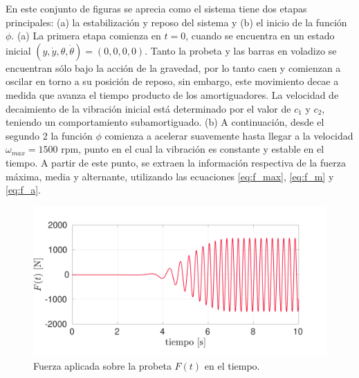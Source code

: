 En este conjunto de figuras se aprecia como el sistema tiene dos etapas principales: (a) la estabilización y reposo del sistema y (b) el inicio de la función $\phi$. (a) La primera etapa comienza en $t=0$, cuando se encuentra en un estado inicial $(y, \dot{y}, \theta, \dot{\theta}) = (0,0,0,0)$. Tanto la probeta y las barras en voladizo se encuentran sólo bajo la acción de la gravedad, por lo tanto caen y comienzan a oscilar en torno a su posición de reposo, sin embargo, este movimiento decae a medida que avanza el tiempo producto de los amortiguadores. La velocidad de decaimiento de la vibración inicial está determinado por el valor de $c_1$ y $c_2$, teniendo un comportamiento subamortiguado. (b) A continuación, desde el segundo 2 la función $\phi$ comienza a acelerar suavemente hasta llegar a la velocidad $\omega_{max} = 1500$ rpm, punto en el cual la vibración es constante y estable en el tiempo. A partir de este punto, se extraen la información respectiva de la fuerza máxima, media y alternante, utilizando las ecuaciones \ref{eq:f_max}, \ref{eq:f_m} y \ref{eq:f_a}. 

\begin{figure}[h]
\centering
\includegraphics[width=0.95\linewidth, trim={0cm 1cm 2cm 1cm},clip]{Imagenes/f_2.pdf}
\caption{Fuerza aplicada sobre la probeta $F(t)$ en el tiempo.}
\label{fig:f_2}
\end{figure}

